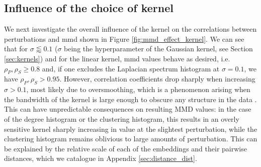 \subsection{Influence of the choice of kernel}

We next investigate the overall influence of the kernel on the correlations
between perturbations and \acrshort{mmd} shown in Figure
\ref{fig:mmd_effect_kernel}. We can see that for $\sigma\lessapprox 0.1$
($\sigma$ being the hyperparameter of the Gaussian kernel, see Section
\ref{sec:kernels}) and for the linear kernel, \acrshort{mmd} values behave as
desired, i.e. $\rho_P, \rho_S\geq 0.8$ and, if one excludes the Laplacian
spectrum histogram at $\sigma=0.1$, we have $\rho_P,\rho_S>0.95$. However,
correlation coefficients drop sharply when increasing $\sigma>0.1$, most likely
due to oversmoothing, which is a phenomenon arising when the bandwidth of the
kernel is large enough to obscure any structure in the data
\citep{hwang1994nonparametric}. This can have unpredictable consequences on
resulting MMD values: in the case of the degree histogram or the clustering
histogram, this results in an overly sensitive kernel sharply increasing in
value at the slightest perturbation, while the clustering histogram remains
oblivious to large amounts of perturbation. This can be explained by the
relative scale of each of the embeddings and their pairwise distances, which we
catalogue in Appendix \ref{sec:distance_dist}. %

